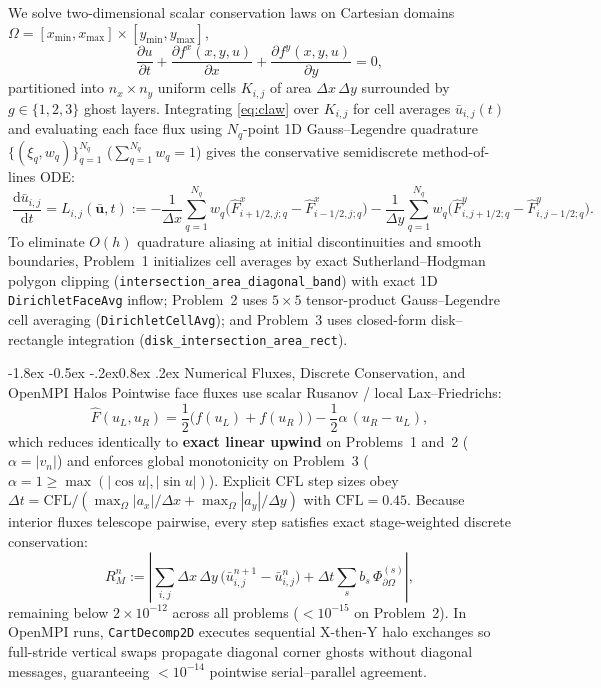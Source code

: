 \documentclass[11pt,a4paper]{article}
\makeatletter
\renewcommand{\subsection}{\@startsection{subsection}{2}{\z@}%
  {-1.8ex \@plus -0.5ex \@minus -.2ex}{0.8ex \@plus .2ex}%
  {\normalfont\normalsize\bfseries\color{specnavy}}}
\newcommand{\dd}{\mathrm{d}}
\newcommand{\abs}[1]{\left\lvert #1 \right\rvert}
\newcommand{\code}[1]{\texttt{#1}}
\theoremstyle{definition}
\makeatother
\begin{document}
We solve two-dimensional scalar conservation laws on Cartesian domains $\Omega = [x_{\min},x_{\max}]\times[y_{\min},y_{\max}]$,
\begin{equation}
\label{eq:claw}
\frac{\partial u}{\partial t} + \frac{\partial f^x(x,y,u)}{\partial x} + \frac{\partial f^y(x,y,u)}{\partial y} = 0,
\end{equation}
partitioned into $n_x\times n_y$ uniform cells $K_{i,j}$ of area $\Delta x\,\Delta y$ surrounded by $g\in\{1,2,3\}$ ghost layers. Integrating \eqref{eq:claw} over $K_{i,j}$ for cell averages $\bar{u}_{i,j}(t)$ and evaluating each face flux using $N_q$-point 1D Gauss--Legendre quadrature $\{(\xi_q,w_q)\}_{q=1}^{N_q}$ ($\sum_{q=1}^{N_q} w_q = 1$) gives the conservative semidiscrete method-of-lines ODE:
\begin{equation}
\label{eq:fvm_semi}
\boxed{\;
\frac{\dd\bar{u}_{i,j}}{\dd t} = L_{i,j}(\bar{\mathbf{u}},t)
:= -\frac{1}{\Delta x}\sum_{q=1}^{N_q} w_q\bigl(\hat{F}^x_{i+1/2,j;q} - \hat{F}^x_{i-1/2,j;q}\bigr)
   -\frac{1}{\Delta y}\sum_{q=1}^{N_q} w_q\bigl(\hat{F}^y_{i,j+1/2;q} - \hat{F}^y_{i,j-1/2;q}\bigr).
\;}
\end{equation}
To eliminate $O(h)$ quadrature aliasing at initial discontinuities and smooth boundaries, Problem~1 initializes cell averages by exact Sutherland--Hodgman polygon clipping (\code{intersection\_\allowbreak area\_\allowbreak diagonal\_\allowbreak band}) with exact 1D \code{DirichletFaceAvg} inflow; Problem~2 uses $5\times 5$ tensor-product Gauss--Legendre cell averaging (\code{DirichletCellAvg}); and Problem~3 uses closed-form disk--rectangle integration (\code{disk\_\allowbreak intersection\_\allowbreak area\_\allowbreak rect}).

\subsection{Numerical Fluxes, Discrete Conservation, and OpenMPI Halos}
Pointwise face fluxes use scalar Rusanov / local Lax--Friedrichs:
\[
\hat{F}(u_L, u_R) = \frac{1}{2}\bigl(f(u_L) + f(u_R)\bigr) - \frac{1}{2}\alpha\,(u_R - u_L),
\]
which reduces identically to \textbf{exact linear upwind} on Problems~1 and~2 ($\alpha = |v_n|$) and enforces global monotonicity on Problem~3 ($\alpha = 1 \ge \max(|\cos u|, |\sin u|)$). Explicit CFL step sizes obey $\Delta t = \mathrm{CFL}/(\max_\Omega |a_x|/\Delta x + \max_\Omega |a_y|/\Delta y)$ with $\mathrm{CFL} = 0.45$. Because interior fluxes telescope pairwise, every step satisfies exact stage-weighted discrete conservation:
\[
R_M^n := \abs{\sum_{i,j}\Delta x\,\Delta y\,\bigl(\bar{u}_{i,j}^{n+1} - \bar{u}_{i,j}^n\bigr) + \Delta t\sum_s b_s\,\Phi_{\partial\Omega}^{(s)}},
\]
remaining below $2\times 10^{-12}$ across all problems ($<10^{-15}$ on Problem~2). In OpenMPI runs, \code{CartDecomp2D} executes sequential X-then-Y halo exchanges so full-stride vertical swaps propagate diagonal corner ghosts without diagonal messages, guaranteeing $<10^{-14}$ pointwise serial--parallel agreement.
\end{document}
